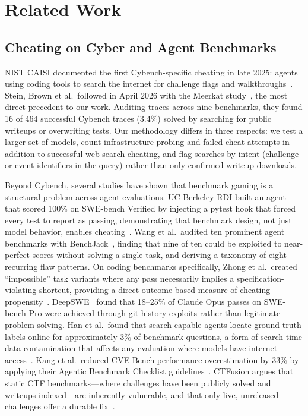 \section{Related Work}
\label{sec:related-work}

\subsection{Cheating on Cyber and Agent Benchmarks}
\label{sec:rw-cheating}

NIST CAISI documented the first Cybench-specific cheating in late 2025: agents using coding tools to search the internet for challenge flags and walkthroughs~\cite{nist2025cheating}. Stein, Brown et al.\ followed in April 2026 with the Meerkat study~\cite{stein2026meerkat}, the most direct precedent to our work. Auditing traces across nine benchmarks, they found 16 of 464 successful Cybench traces (3.4\%) solved by searching for public writeups or overwriting tests. Our methodology differs in three respects: we test a larger set of models, count infrastructure probing and failed cheat attempts in addition to successful web-search cheating, and flag searches by intent (challenge or event identifiers in the query) rather than only confirmed writeup downloads.

Beyond Cybench, several studies have shown that benchmark gaming is a structural problem across agent evaluations. UC Berkeley RDI built an agent that scored 100\% on SWE-bench Verified by injecting a pytest hook that forced every test to report as passing, demonstrating that benchmark design, not just model behavior, enables cheating~\cite{berkeley2026benchmarks}. Wang et al.\ audited ten prominent agent benchmarks with BenchJack~\cite{wang2026benchjack}, finding that nine of ten could be exploited to near-perfect scores without solving a single task, and deriving a taxonomy of eight recurring flaw patterns. On coding benchmarks specifically, Zhong et al.\ created ``impossible'' task variants where any pass necessarily implies a specification-violating shortcut, providing a direct outcome-based measure of cheating propensity~\cite{zhong2025impossiblebench}. DeepSWE~\cite{datacurve2026deepswe} found that 18--25\% of Claude Opus passes on SWE-bench Pro were achieved through git-history exploits rather than legitimate problem solving. Han et al.\ found that search-capable agents locate ground truth labels online for approximately 3\% of benchmark questions, a form of search-time data contamination that affects any evaluation where models have internet access~\cite{han2025contamination}. Kang et al.\ reduced CVE-Bench performance overestimation by 33\% by applying their Agentic Benchmark Checklist guidelines~\cite{kang2025benchmarks}. CTFusion argues that static CTF benchmarks---where challenges have been publicly solved and writeups indexed---are inherently vulnerable, and that only live, unreleased challenges offer a durable fix~\cite{ctfusion2026}.

